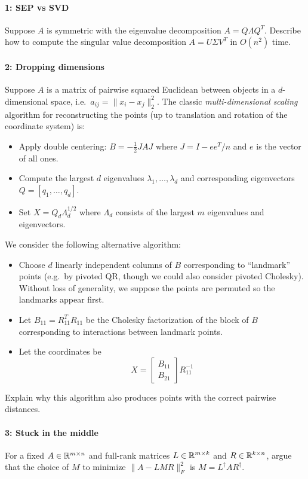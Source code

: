 \documentclass[12pt, leqno]{article} %
\begin{document}

\paragraph*{1: SEP vs SVD}
Suppose $A$ is symmetric with the eigenvalue decomposition
$A = Q \Lambda Q^T$.  Describe how to compute the singular value
decomposition $A = U \Sigma V^T$ in $O(n^2)$ time.

\paragraph*{2: Dropping dimensions}
Suppose $A$ is a matrix of pairwise squared Euclidean between objects
in a $d$-dimensional space, i.e.~$a_{ij} = \|x_i-x_j\|_2^2$.  The
classic {\em multi-dimensional scaling} algorithm for reconstructing the
points (up to translation and rotation of the coordinate system) is:
\begin{itemize}
\item Apply double centering: $B = -\frac{1}{2} J A J$ where
  $J = I-ee^T/n$ and $e$ is the vector of all ones.
\item Compute the largest $d$ eigenvalues $\lambda_1, \ldots,
  \lambda_d$ and corresponding eigenvectors $Q = [q_1, \ldots, q_d]$.
\item Set $X = Q_d \Lambda_d^{1/2}$ where $\Lambda_d$ consists of the
  largest $m$ eigenvalues and eigenvectors.
\end{itemize}
We consider the following alternative algorithm:
\begin{itemize}
\item
  Choose $d$ linearly independent columns of $B$ corresponding to
  ``landmark'' points (e.g.~by pivoted QR, though we could also
  consider pivoted Cholesky).  Without loss of generality, we suppose
  the points are permuted so the landmarks appear first.
\item
  Let $B_{11} = R_{11}^T R_{11}$ be the Cholesky factorization of the
  block of $B$ corresponding to interactions between landmark points.
\item
  Let the coordinates be
  \[
    X = \begin{bmatrix} B_{11} \\ B_{21} \end{bmatrix} R_{11}^{-1}
  \]
\end{itemize}
Explain why this algorithm also produces points with the correct
pairwise distances.

\paragraph*{3: Stuck in the middle}
For a fixed $A \in \mathbb{R}^{m \times n}$ and full-rank matrices
$L \in \mathbb{R}^{m \times k}$ and $R \in \mathbb{R}^{k \times n}$,
argue that the choice of $M$ to minimize $\|A-LMR\|_F^2$
is $M = L^\dagger A R^\dagger$.
\end{document}
